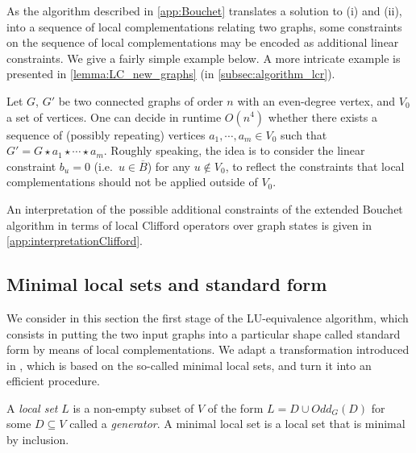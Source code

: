 \documentclass[a4paper,UKenglish,cleveref,autoref,thm-restate]{arxiv}
\newcommand{\se}{\subseteq}
\begin{document}
As the algorithm described in \cref{app:Bouchet} translates a solution to (i) and (ii), into a sequence of local complementations relating two graphs, some constraints on the sequence of local complementations may be encoded as additional linear constraints. We give a fairly simple example below. A more intricate example is presented in \cref{lemma:LC_new_graphs} (in \cref{subsec:algorithm_lcr}).

\begin{example} \label{ex:V0}
    Let $G$, $G'$ be two connected graphs of order $n$ with an even-degree vertex, and $V_0$ a set of vertices. One can decide in runtime $O(n^4)$ whether there exists a sequence of (possibly repeating) vertices $a_1, \cdots, a_m\in V_0 $ such that $G' = G \star a_1 \star \cdots \star a_m$. Roughly speaking, the idea is to consider the linear constraint $b_u=0$ (i.e.~$u\in   \overline B$) for any $u\notin V_0$, to reflect the constraints that local complementations should not be applied outside of $V_0$.
\end{example}

An interpretation of the possible additional constraints of the extended Bouchet algorithm in terms of local Clifford operators over graph states is given in \cref{app:interpretationClifford}.

\subsection{Minimal local sets and standard form} \label{subsec:mls}

We consider in this section the first stage of the LU-equivalence algorithm, which consists in putting the two input graphs into a particular shape called standard form by means of local complementations. We adapt a transformation introduced in \cite{claudet2024local}, which is based on the so-called minimal local sets, 
and turn it into an efficient procedure. 


\begin{definition} A \emph{local set} $L$ is a non-empty subset of $V$ of the form $L = D \cup Odd_G(D)$ for some $D \se V$ called a \emph{generator}. A minimal local set is a local set that is minimal by inclusion.
\end{definition}
\end{document}
